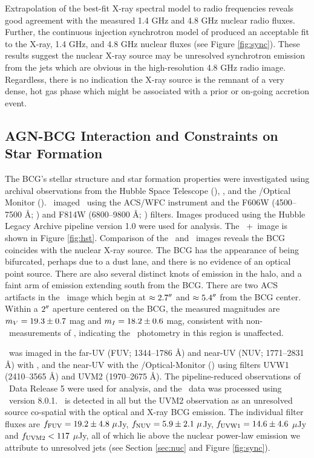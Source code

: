 \documentclass[iop]{emulateapj}
\begin{document}
Extrapolation of the best-fit X-ray spectral model to radio
frequencies reveals good agreement with the measured 1.4 GHz and 4.8
GHz nuclear radio fluxes. Further, the continuous injection
synchrotron model of \citet{1987MNRAS.225..335H} produced an
acceptable fit to the X-ray, 1.4 GHz, and 4.8 GHz nuclear fluxes (see
Figure \ref{fig:sync}). These results suggest the nuclear X-ray source
may be unresolved synchrotron emission from the jets which are obvious
in the high-resolution 4.8 GHz radio image. Regardless, there is no
indication the X-ray source is the remnant of a very dense, hot gas
phase which might be associated with a prior or on-going accretion
event.

\subsection{AGN-BCG Interaction and Constraints on Star Formation}
\label{sec:bcg}

The BCG's stellar structure and star formation properties were
investigated using archival observations from the Hubble Space
Telescope (\hst), \galex, and the \xmm/Optical Monitor
(\xom). \hst\ imaged \rbs\ using the ACS/WFC instrument and the F606W
(4500--7500 \AA; \myv) and F814W (6800--9800 \AA; \myi)
filters. Images produced using the Hubble Legacy Archive pipeline
version 1.0 were used for analysis. The \hst\ \myv+\myi\ image is
shown in Figure \ref{fig:hst}. Comparison of the \hst\ and
\cxo\ images reveals the BCG coincides with the nuclear X-ray
source. The BCG has the appearance of being bifurcated, perhaps due to
a dust lane, and there is no evidence of an optical point
source. There are also several distinct knots of emission in the halo,
and a faint arm of emission extending south from the BCG. There are
two ACS artifacts in the \myi\ image which begin at $\approx 2.7\rm{^\prime}\hskip -0.1em\rm{^\prime}$
and $\approx 5.4\rm{^\prime}\hskip -0.1em\rm{^\prime}$ from the BCG center. Within a $2\rm{^\prime}\hskip -0.1em\rm{^\prime}$ aperture
centered on the BCG, the measured magnitudes are $m_{V} = 19.3 \pm
0.7$ mag and $m_{I} = 18.2 \pm 0.6$ mag, consistent with
non-\hst\ measurements of \citet{rbs1}, indicating the
\hst\ photometry in this region is unaffected.

\rbs\ was imaged in the far-UV (FUV; 1344--1786 \AA) and near-UV (NUV;
1771--2831 \AA) with \galex, and the near-UV with the
\xmm/Optical-Monitor (\xom) using filters UVW1 (2410--3565 \AA) and
UVM2 (1970--2675 \AA). The pipeline-reduced observations of
\galex\ Data Release 5 were used for analysis, and the \xom\ data was
processed using \sas\ version 8.0.1. \rbs\ is detected in all but the
UVM2 observation as an unresolved source co-spatial with the optical
and X-ray BCG emission. The individual filter fluxes are $f_{\rm{FUV}}
= 19.2 \pm 4.8 ~\mu$Jy, $f_{\rm{NUV}} = 5.9 \pm 2.1 ~\mu$Jy,
$f_{\rm{UVW1}} = 14.6 \pm 4.6$ $\mu$Jy and $f_{\rm{UVM2}} < 117$
$\mu$Jy, all of which lie above the nuclear power-law emission we
attribute to unresolved jets (see Section \ref{sec:nuc} and Figure
\ref{fig:sync}).
\end{document}
